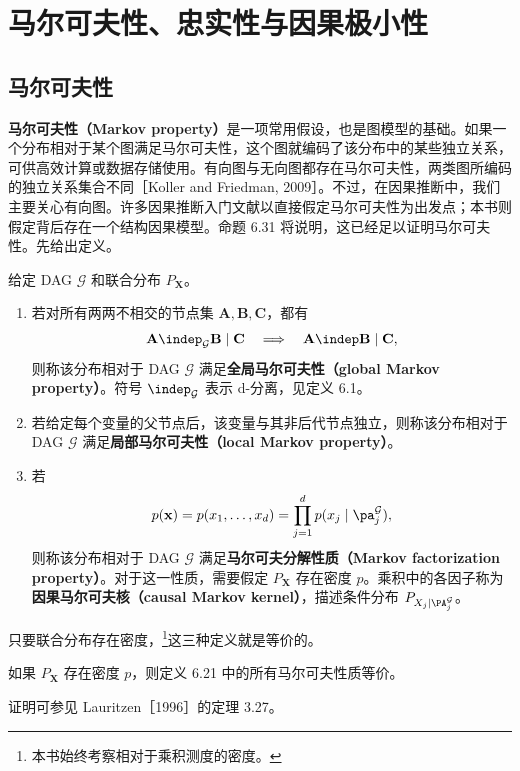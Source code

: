 \section{马尔可夫性、忠实性与因果极小性}
\label{sec:ch06-markov-faithfulness}
\subsection{马尔可夫性}

\textbf{马尔可夫性（Markov property）}是一项常用假设，也是图模型的基础。如果一个分布相对于某个图满足马尔可夫性，这个图就编码了该分布中的某些独立关系，可供高效计算或数据存储使用。有向图与无向图都存在马尔可夫性，两类图所编码的独立关系集合不同［Koller and Friedman, 2009］。不过，在因果推断中，我们主要关心有向图。许多因果推断入门文献以直接假定马尔可夫性为出发点；本书则假定背后存在一个结构因果模型。命题 6.31 将说明，这已经足以证明马尔可夫性。先给出定义。

\begin{definition}[马尔可夫性]
给定 DAG $\mathcal G$ 和联合分布 $P_{\mathbf X}$。
\begin{enumerate}[label=(\roman*)]
 \item 若对所有两两不相交的节点集 $\mathbf A,\mathbf B,\mathbf C$，都有
 \[
 \mathbf A\indep_{\mathcal G}\mathbf B\mid\mathbf C
 \quad\Longrightarrow\quad
 \mathbf A\indep\mathbf B\mid\mathbf C,
 \]
 则称该分布相对于 DAG $\mathcal G$ 满足\textbf{全局马尔可夫性（global Markov property）}。符号 $\indep_{\mathcal G}$ 表示 d-分离，见定义 6.1。
 \item 若给定每个变量的父节点后，该变量与其非后代节点独立，则称该分布相对于 DAG $\mathcal G$ 满足\textbf{局部马尔可夫性（local Markov property）}。
 \item 若
 \[
 p(\mathbf x)=p(x_1,\ldots,x_d)
 =\prod_{j=1}^d p(x_j\mid\pa_j^{\mathcal G}),
 \]
 则称该分布相对于 DAG $\mathcal G$ 满足\textbf{马尔可夫分解性质（Markov factorization property）}。对于这一性质，需要假定 $P_{\mathbf X}$ 存在密度 $p$。乘积中的各因子称为\textbf{因果马尔可夫核（causal Markov kernel）}，描述条件分布 $P_{X_j\mid\PA_j^{\mathcal G}}$。
\end{enumerate}
\end{definition}

只要联合分布存在密度，\footnote{本书始终考察相对于乘积测度的密度。}这三种定义就是等价的。

\begin{theorem}[马尔可夫性质的等价性]
如果 $P_{\mathbf X}$ 存在密度 $p$，则定义 6.21 中的所有马尔可夫性质等价。
\end{theorem}
证明可参见 Lauritzen［1996］的定理 3.27。

